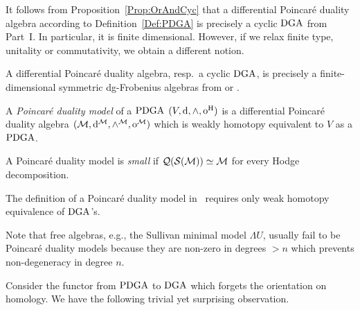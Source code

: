 \documentclass[\MainFolder/Text.tex]{subfiles}
\begin{document}
It follows from Proposition~\ref{Prop:OrAndCyc} that a differential Poincar\'e duality algebra according to Definition~\ref{Def:PDGA} is precisely a cyclic $\mathrm{DGA}$ from Part~I. In particular, it is finite dimensional. However, if we relax finite type, unitality or commutativity, we obtain a different notion.

\begin{Remark}
A differential Poincar\'e duality algebra, resp.~a cyclic $\mathrm{DGA}$, is precisely a finite-dimensional symmetric dg-Frobenius algebras from \cite[p.~13]{Vallette2012} or \cite[Theorem~1.1]{Cohen2006}. 
\end{Remark}

\begin{Definition}\label{Def:PDModel}
A \emph{Poincar\'e duality model} of a $\mathrm{PDGA}$ $(V,\mathrm{d},\wedge,\mathrm{o}^{\mathrm{H}})$ is a differential Poincar\'e duality algebra $(\mathcal{M},\mathrm{d}^{\mathcal{M}},\wedge^{\mathcal{M}},\mathrm{o}^{\mathcal{M}})$ which is weakly homotopy equivalent to $V$ as a $\mathrm{PDGA}$.

A Poincar\'e duality model is \emph{small} if $\mathcal{Q}(\mathcal{S}(\mathcal{M})) \simeq \mathcal{M}$ for every Hodge decomposition.
\end{Definition}

The definition of a Poincar\'e duality model in~\cite{Lambrechts2007} requires only weak homotopy equivalence of $\mathrm{DGA}$'s.

Note that free algebras, e.g., the Sullivan minimal model $\Lambda U$, usually fail to be Poincar\'e duality models because they are non-zero in degrees $>n$ which prevents non-degeneracy in degree $n$.

Consider the functor from $\mathrm{PDGA}$ to $\mathrm{DGA}$ which forgets the orientation on homology. We have the following trivial yet surprising observation.
\end{document}
